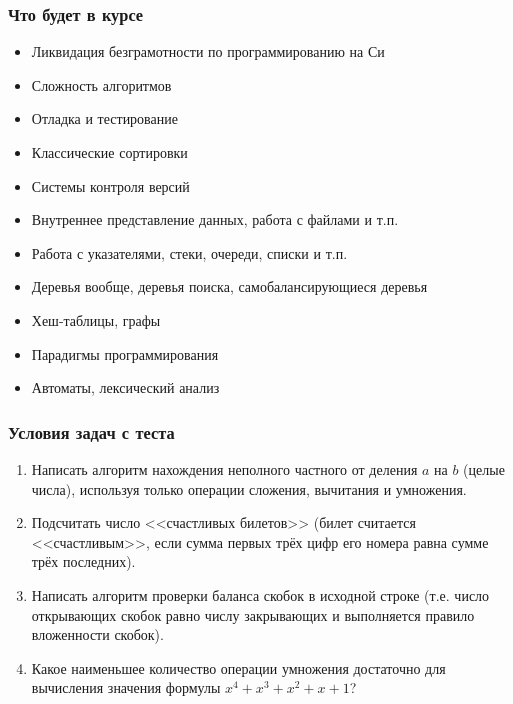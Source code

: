 \documentclass{../../slides-style}
\begin{document}
    \begin{frame}
        \frametitle{Что будет в курсе}
        \begin{itemize}
            \item Ликвидация безграмотности по программированию на Си
            \item Сложность алгоритмов
            \item Отладка и тестирование
            \item Классические сортировки
            \item Системы контроля версий
            \item Внутреннее представление данных, работа с файлами и т.п.
            \item Работа с указателями, стеки, очереди, списки и т.п.
            \item Деревья вообще, деревья поиска, самобалансирующиеся деревья
            \item Хеш-таблицы, графы
            \item Парадигмы программирования
            \item Автоматы, лексический анализ
        \end{itemize}
    \end{frame}

    \begin{frame}
        \frametitle{Условия задач с теста}
        \begin{enumerate}
            \item Написать алгоритм нахождения неполного частного от деления $a$ на $b$ (целые числа), используя только операции сложения, вычитания и умножения.
            \item Подсчитать число <<счастливых билетов>> (билет считается <<счастливым>>, если сумма первых трёх цифр его номера равна сумме трёх последних).
            \item Написать алгоритм проверки баланса скобок в исходной строке (т.е. число открывающих скобок равно числу закрывающих и выполняется правило вложенности скобок).
            \item Какое наименьшее количество операции умножения достаточно для вычисления значения формулы $x^4 + x^3 + x^2 + x + 1$?
        \end{enumerate}
    \end{frame}
\end{document}
